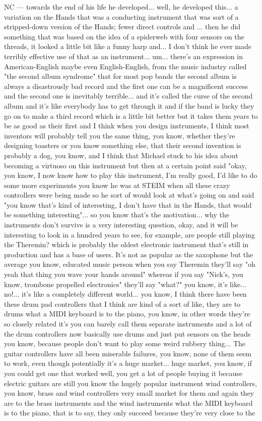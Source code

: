 NC — towards the end of his life he developed... well, he developed this... a variation on the Hands that was a conducting instrument that was sort of a stripped-down version of the Hands;  fewer direct controls and ... then he did something that was based on the idea of a spiderweb with four sensors on the threads, it looked a little bit like a funny harp and... I don't think he ever made terribly effective use of that as an instrument... um... there's an expression in American-English maybe even English-English, from the music industry called "the second album syndrome" that for most pop bands the second album is always a disastrously bad record and the first one can be a magnificent success and  the second one is inevitably terrible... and it's called the curse of the second album  and it's like everybody has to get through it and if the band is lucky they go on to make a third record which is a little bit better but it takes them years to be as good as their first and I think when you design instruments, I think most inventors will probably tell you the same thing, you know, whether they're designing toasters or you know something else, that their second invention is probably a dog, you know, and I think that Michael stuck to his idea about becoming a virtuoso on this instrument but then at a certain point said "okay, you know, I now know how to play this instrument, I'm really good, I'd like to do some more experiments you know he was at STEIM when all these crazy controllers were being made so he sort of would look at what's going on and said "you know that's kind of interesting, I don't have that in the Hands, that would be something interesting"... so you know that's the motivation... why the instruments don't survive is a very interesting question, okay, and it will be interesting to look in a hundred years to see, for example, are people still playing the Theremin? which is probably the oldest electronic instrument that's still in production and has a base of users. It's not as popular as the saxophone but the average you know, educated music person when you say Theremin they'll say "oh yeah that thing you wave your hands around" whereas if you say "Nick's, you know, trombone propelled electronics" they'll say "what?" you know, it's like... no!... it's like a completely different world... you know, I think there have been these drum pad controllers that I think are kind of a sort of like, they are to drums what a MIDI keyboard is to the piano, you know, in other words they're so closely related it's you can barely call them separate instruments and a lot of the drum controllers now basically use drums and just put sensors on the heads you know, because people don't want to play some weird rubbery thing... The guitar controllers have all been miserable failures, you know, none of them seem to work, even though potentially it's a huge market... huge market, you know, if you could get one that worked well, you get a lot of people buying it because electric guitars are still you know the hugely popular instrument wind controllers, you know, brass and wind controllers very small market for them and again they are  to the brass instruments and the wind instruments what the MIDI keyboard is to the piano, that is to say, they only succeed because they're very close to the 